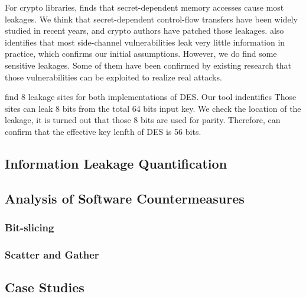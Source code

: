 For crypto libraries, \tool{} finds that secret-dependent memory accesses 
cause most leakages. We think that secret-dependent
control-flow transfers have been widely studied in recent years, 
and crypto authors have patched those leakages.
\tool{} also identifies that most side-channel vulnerabilities 
leak very little information in practice, which confirms our initial
assumptions. 
However, we do find some sensitive leakages. 
Some of them have been confirmed by existing research that those 
vulnerabilities can be exploited
to realize real attacks. 

\tool{} find 8 leakage sites for both implementations of DES. Our tool
indentifies Those sites can leak 8 bits from the total 64 bits 
input key. We check the location of the leakage, it is turned out that
those 8 bits are used for parity. Therefore, \tool{} can confirm that 
the effective key lenfth of DES is 56 bits.

\subsection{Information Leakage Quantification}
\subsection{Analysis of Software Countermeasures}
\subsubsection{Bit-slicing}
\subsubsection{Scatter and Gather}
\subsection{Case Studies}

